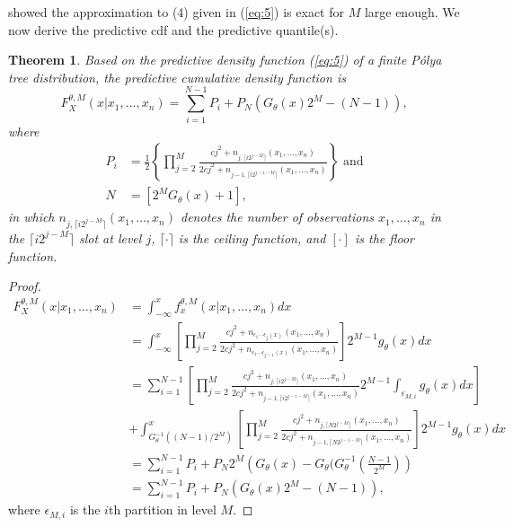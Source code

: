 \documentclass[12pt]{article}
\newtheorem{thm}{Theorem}[subsection]
\newcommand{\polya}{P\'{o}lya}
\begin{document}
\noindent \citep{hanson2002} showed the approximation to (4) given in
(\ref{eq:5}) is exact for $M$ large enough.  We now derive the
predictive cdf and the predictive quantile(s).

\begin{thm}
  Based on the predictive density function (\ref{eq:5}) of a
  finite \polya{} tree distribution,
  the predictive cumulative density function is
  \begin{equation}
    \label{eq:6}
    F^{\theta,M}_X(x|x_1, \ldots, x_n) = \sum_{i=1}^{N-1} P_{i} + P_N
    \left( G_{\theta}(x)2^M -(N-1) \right),
  \end{equation}
  where
  \begin{align*}
    P_i &= \frac{1}{2} \left\{\prod_{j=2}^M \frac{cj^2 + n_{j,\lceil i2^{j-M}
          \rceil}(x_1, \ldots, x_n)}{2cj^2 + n_{j-1,\lceil
          i2^{j-1-M} \rceil}(x_{1 },\ldots, x_n)} \right\} \mbox{ and}\\
    N & = \left[ 2^{M } G_{\theta}(x)   +1\right],
  \end{align*}
  in which $n_{j,\lceil i2^{j-M}
    \rceil}(x_1, \ldots, x_n)$ denotes the number of observations $x_1,
  \ldots, x_n$ in the $\lceil i2^{j-M}
  \rceil$ slot at level $j$, $\lceil \cdot
  \rceil$ is the ceiling function, and $[ \cdot ]$ is the floor function.
\end{thm}

\begin{proof}
  \begin{align*}
    F^{\theta,M}_X(x| x_1, \ldots, x_n) & = \int_{-\infty}^x
    f_x^{\theta,M} (x|x_1, \ldots, x_n) dx \\
    & = \int_{-\infty}^x \left[
      \prod_{j=2}^M \frac{cj^2 + n_{\epsilon_1 \cdots \epsilon_j(x) }(x_1 , \ldots, x_n)}{2cj^2
        + n_{\epsilon_1 \cdots \epsilon_{j-1}(x)}(x_1, \ldots, x_n)}
    \right]2^{M-1} g_\theta(x) dx \\
    & =  \sum_{i=1}^{N-1} \left[ \prod_{j=2}^M \frac{cj^2 + n_{j, \lceil i2^{j-M}
          \rceil}(x_1,
        \ldots, x_n)}{2cj^2 + n_{j-1, \lceil i2^{j-1-M}
          \rceil}(x_1, \ldots, x_n)} 2^{M-1}
      \int_{\epsilon_{M,i}} g_{\theta}(x) dx \right] \\
    &+
    \int_{G^{-1}_{\theta}((N-1)/2^M)}^x \left[ \prod_{j=2}^M \frac{cj^2 + n_{j, \lceil N2^{j-M}
          \rceil}(x_1,
        \ldots, x_n)}{2cj^2 + n_{j-1, \lceil N2^{j-1-M}
          \rceil}(x_1, \ldots, x_n)}\right] 2^{M-1}
    g_{\theta}(x) dx \\
    & = \sum_{i=1}^{N-1} P_i + P_N 2^M \left( G_{\theta}(x) -
      G_{\theta}(G_{\theta}^{-1}\left( \frac{N-1}{2^M} \right)\right)\\
    & = \sum_{i=1}^{N-1}P_i + P_N \left( G_{\theta}(x) 2^M - (N-1) \right),
  \end{align*}
  where $\epsilon_{M,i}$ is the $i$th partition in level $M$.
\end{proof}
\end{document}
